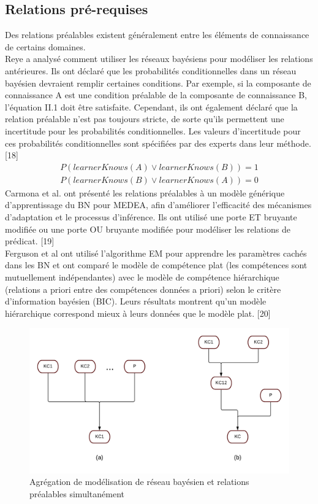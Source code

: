 \subsection{Relations pré-requises}
Des relations préalables existent généralement entre les éléments de connaissance de certains domaines. \\
Reye a analysé comment utiliser les réseaux bayésiens pour modéliser les relations antérieures. Ils ont déclaré que les probabilités conditionnelles dans un réseau bayésien devraient remplir certaines conditions. Par exemple, si la composante de connaissance A est une condition préalable de la composante de connaissance B, l'équation II.1 doit être satisfaite. Cependant, ils ont également déclaré que la relation préalable n'est pas toujours stricte, de sorte qu'ils permettent une incertitude pour les probabilités conditionnelles. Les valeurs d'incertitude pour ces probabilités conditionnelles sont spécifiées par des experts dans leur méthode. [18]
\begin{equation}
	\begin{split}
		P(learnerKnows(A) \vee  learnerKnows(B)) = 1\\
	P(learnerKnows(B) \vee learnerKnows(A)) = 0
	\end{split}
\end{equation}
Carmona et al. ont présenté les relations préalables à un modèle générique d'apprentissage du BN pour MEDEA, afin d'améliorer l'efficacité des mécanismes d'adaptation et le processus d'inférence. Ils ont utilisé une porte ET bruyante modifiée ou une porte OU bruyante modifiée pour modéliser les relations de prédicat. [19] \\
Ferguson et al ont utilisé l'algorithme EM pour apprendre les paramètres cachés dans les BN et ont comparé le modèle de compétence plat (les compétences sont mutuellement indépendantes) avec le modèle de compétence hiérarchique (relations a priori entre des compétences données a priori) selon le critère d'information bayésien (BIC). Leurs résultats montrent qu'un modèle hiérarchique correspond mieux à leurs données que le modèle plat. [20]

\begin{figure}[H]
	\begin{center}
		\includegraphics[width=\textwidth]{images/chapitre2/aggregationModelisation.png}
	\end{center}
\caption{Agrégation de modélisation de réseau bayésien et relations préalables simultanément}
\label{agregationModelisation}
\end{figure}

